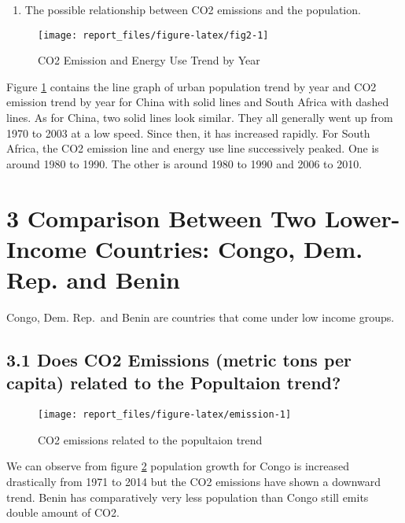 \documentclass[11pt,a4paper,]{article}
\providecommand{\tightlist}{%
  \setlength{\itemsep}{0pt}\setlength{\parskip}{0pt}}
\begin{document}
\begin{enumerate}
\def\labelenumi{(\arabic{enumi})}
\setcounter{enumi}{2}
\tightlist
\item
  The possible relationship between CO2 emissions and the population.
\end{enumerate}

\begin{figure}[!h]

{\centering \texttt{[image: report\_files/figure-latex/fig2-1]} 

}

\caption{CO2 Emission and Energy Use Trend by Year}\label{fig:fig2}
\end{figure}

Figure \ref{fig:fig2} contains the line graph of urban population trend by year and CO2 emission trend by year for China with solid lines and South Africa with dashed lines. As for China, two solid lines look similar. They all generally went up from 1970 to 2003 at a low speed. Since then, it has increased rapidly. For South Africa, the CO2 emission line and energy use line successively peaked. One is around 1980 to 1990. The other is around 1980 to 1990 and 2006 to 2010.

\clearpage
\section*{3 Comparison Between Two Lower-Income Countries: Congo, Dem. Rep. and Benin}

Congo, Dem. Rep.~and Benin are countries that come under low income groups.

\subsection*{3.1 Does CO2 Emissions (metric tons per capita) related to the Popultaion trend?}

\begin{figure}[!h]

{\centering \texttt{[image: report\_files/figure-latex/emission-1]} 

}

\caption{CO2 emissions related to the popultaion trend}\label{fig:emission}
\end{figure}

We can observe from figure \ref{fig:emission} population growth for Congo is increased drastically from 1971 to 2014 but the CO2 emissions have shown a downward trend.
Benin has comparatively very less population than Congo still emits double amount of CO2.
\end{document}

